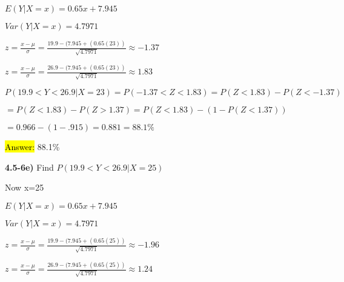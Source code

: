 \documentclass{article}
\begin{document}
$E(Y | X=x)=0.65x+7.945$

\vspace{2mm}

$Var(Y|X=x)=4.7971$


\vspace{2mm}

$z=\frac{x-\mu}{\sigma}=\frac{19.9-(7.945+(0.65(23))}{\sqrt{4.7971}} \approx-1.37$

\vspace{2mm}


$z=\frac{x-\mu}{\sigma}=\frac{26.9-(7.945+(0.65(23))}{\sqrt{4.7971}} \approx 1.83$

\vspace{2mm}


$P(19.9 < Y < 26.9 | X=23)=P(-1.37< Z < 1.83 )=P(Z < 1.83)-P(Z <-1.37)$

\vspace{2mm}


$=P(Z < 1.83)-P(Z > 1.37)= P(Z < 1.83)-(1-P(Z < 1.37))$

\vspace{2mm}

$=0.966-(1-.915)=0.881=88.1\%$

\vspace{2mm}



\hl{Answer:} 88.1\%


\vspace{4mm}


\textbf{4.5-6e)} Find $P(19.9 < Y < 26.9 | X=25)$

\vspace{2mm}

Now x=25

\vspace{2mm}

$E(Y | X=x)=0.65x+7.945$

\vspace{2mm}

$Var(Y|X=x)=4.7971$

\vspace{2mm}


$z=\frac{x-\mu}{\sigma}=\frac{19.9-(7.945+(0.65(25))}{\sqrt{4.7971}} \approx-1.96$

\vspace{2mm}


$z=\frac{x-\mu}{\sigma}=\frac{26.9-(7.945+(0.65(25))}{\sqrt{4.7971}} \approx 1.24$


\vspace{2mm}
\end{document}
